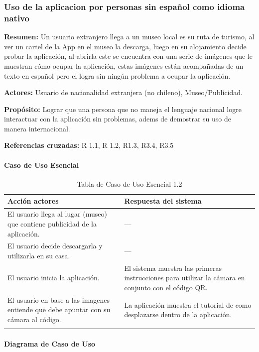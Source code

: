 \subsubsection{Uso de la aplicacion por personas sin español como idioma nativo}

{\textbf {Resumen:}}
Un usuario extranjero llega a un museo local es su ruta de turismo, al ver un cartel de la App en el museo la descarga, luego en su alojamiento decide probar la aplicación, al abrirla este se encuentra con una serie de imágenes que le muestran cómo ocupar la aplicación, estas imágenes están acompañadas de un texto en español pero el logra sin ningún problema a ocupar la aplicación.

{\textbf {Actores:}}
Usuario de nacionalidad extranjera (no chileno), Museo/Publicidad.

{\textbf {Propósito:}}
Lograr que una persona que no maneja el lenguaje nacional logre interactuar con la aplicación sin problemas, adems de demostrar su uso de manera internacional.

{\textbf {Referencias cruzadas:}}
R 1.1, R 1.2, R1.3, R3.4, R3.5

\paragraph{Caso de Uso Esencial}

\begin{longtable}{|p{5cm}|p{8cm}|}
\hline 
Acción actores & Respuesta del sistema \\ 
\hline 
El usuario llega al lugar (museo) que contiene publicidad de la aplicación. & --- \\ 
\hline 
El usuario decide descargarla y utilizarla en su casa. & --- \\ 
\hline 
El usuario inicia la aplicación. & El sistema muestra las primeras instrucciones para utilizar la cámara en conjunto con el código QR.
 \\ 
\hline 
El usuario en base a las imagenes entiende que debe apuntar con su cámara al código. & La aplicación muestra el tutorial de como desplazarse dentro de la aplicación. \\ 
\hline 
\caption{Tabla de Caso de Uso Esencial 1.2}
\label{tab22}
\end{longtable}

\paragraph{Diagrama de Caso de Uso}


